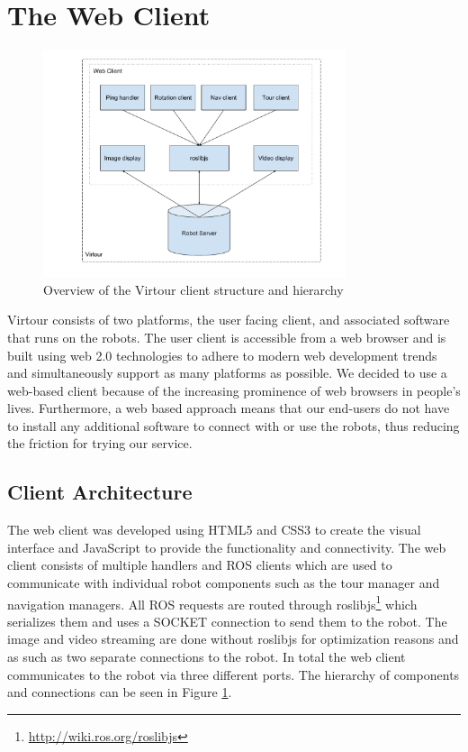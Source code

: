 \documentclass[
  oneside,
  11pt, a4paper,
  footinclude=true,
  headinclude=true,
  cleardoublepage=empty
]{article}
\begin{document}
\section{The Web Client}\label{sec:client}

\begin{figure}
  \centering
  \includegraphics[width=3.5in]{virtour_client}
  \caption{Overview of the Virtour client structure and hierarchy}
  \label{fig:client}
\end{figure}

Virtour consists of two platforms, the user facing client, and associated
software that runs on the robots. The user client is accessible from a web
browser and is built using web 2.0 technologies to adhere to modern web
development trends and simultaneously support as many platforms as possible. We
decided to use a web-based client because of the increasing prominence of web
browsers in people's lives. Furthermore, a web based approach means that our
end-users do not have to install any additional software to connect with or use
the robots, thus reducing the friction for trying our service.

\subsection{Client Architecture}

The web client was developed using HTML5 and CSS3 to create the visual
interface and JavaScript to provide the functionality and connectivity. The
web client consists of multiple handlers and ROS clients which are used to
communicate with individual robot components such as the tour manager and
navigation managers. All ROS requests are routed through
roslibjs\footnote{\url{http://wiki.ros.org/roslibjs}} which serializes them and
uses a SOCKET connection to send them to the robot. The image and video
streaming are done without roslibjs for optimization reasons and as such as two
separate connections to the robot. In total the web client communicates to the
robot via three different ports. The hierarchy of components and connections
can be seen in Figure \ref{fig:client}. 
\end{document}
